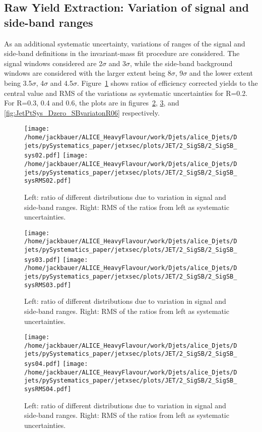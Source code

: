 \subsection{Raw Yield Extraction: Variation of signal and side-band ranges}
As an additional systematic uncertainty, variations of ranges of the signal and side-band definitions in the invariant-mass fit procedure are considered. The signal windows considered are 2$\sigma$ and 3$\sigma$, while the side-band background windows are considered with the larger extent being 8$\sigma$, 9$\sigma$ and the lower extent being 3.5$\sigma$, 4$\sigma$ and 4.5$\sigma$.
Figure~\ref{fig:JetPtSys_Dzero_SBvariatonR02} shows ratios of efficiency corrected yields to the central value and RMS of the variations as systematic uncertainties for R=0.2. For R=0.3, 0.4 and 0.6, the plots are in figures~\ref{fig:JetPtSys_Dzero_SBvariatonR03}, \ref{fig:JetPtSys_Dzero_SBvariatonR04}, and \ref{fig:JetPtSys_Dzero_SBvariatonR06} respectively.
\begin{figure}[bth]
\begin{center}
\texttt{[image: /home/jackbauer/ALICE\_HeavyFlavour/work/Djets/alice\_Djets/Djets/pySystematics\_paper/jetxsec/plots/JET/2\_SigSB/2\_SigSB\_sys02.pdf]}
\texttt{[image: /home/jackbauer/ALICE\_HeavyFlavour/work/Djets/alice\_Djets/Djets/pySystematics\_paper/jetxsec/plots/JET/2\_SigSB/2\_SigSB\_sysRMS02.pdf]}
\caption{Left: ratio of different distributions due to variation in signal and side-band ranges. Right: RMS of the ratios from left as systematic uncertainties.} 
\label{fig:JetPtSys_Dzero_SBvariatonR02}
\end{center}
\end{figure}
\begin{figure}[bth]
\begin{center}
\texttt{[image: /home/jackbauer/ALICE\_HeavyFlavour/work/Djets/alice\_Djets/Djets/pySystematics\_paper/jetxsec/plots/JET/2\_SigSB/2\_SigSB\_sys03.pdf]}
\texttt{[image: /home/jackbauer/ALICE\_HeavyFlavour/work/Djets/alice\_Djets/Djets/pySystematics\_paper/jetxsec/plots/JET/2\_SigSB/2\_SigSB\_sysRMS03.pdf]}
\caption{Left: ratio of different distributions due to variation in signal and side-band ranges. Right: RMS of the ratios from left as systematic uncertainties.} 
\label{fig:JetPtSys_Dzero_SBvariatonR03}
\end{center}
\end{figure}
\begin{figure}[bth]
\begin{center}
\texttt{[image: /home/jackbauer/ALICE\_HeavyFlavour/work/Djets/alice\_Djets/Djets/pySystematics\_paper/jetxsec/plots/JET/2\_SigSB/2\_SigSB\_sys04.pdf]}
\texttt{[image: /home/jackbauer/ALICE\_HeavyFlavour/work/Djets/alice\_Djets/Djets/pySystematics\_paper/jetxsec/plots/JET/2\_SigSB/2\_SigSB\_sysRMS04.pdf]}
\caption{Left: ratio of different distributions due to variation in signal and side-band ranges. Right: RMS of the ratios from left as systematic uncertainties.} 
\label{fig:JetPtSys_Dzero_SBvariatonR04}
\end{center}
\end{figure}
